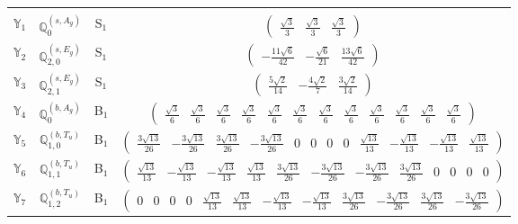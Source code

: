 \documentclass[fleqn,10pt,landscape]{article}
\begin{document}
\begin{itemize}
\begin{center}
\begin{longtable}{c|c|c|c}
 \hline \hline
\multicolumn{3}{r}{} \\ \endlastfoot

$ \mathbb{Y}_{1} $ & $\mathbb{Q}_{0}^{(s,A_{g})}$ & S$_{1}$ & $\begin{pmatrix} \frac{\sqrt{3}}{3} & \frac{\sqrt{3}}{3} & \frac{\sqrt{3}}{3} \end{pmatrix}$ \\
$ \mathbb{Y}_{2} $ & $\mathbb{Q}_{2,0}^{(s,E_{g})}$ & S$_{1}$ & $\begin{pmatrix} - \frac{11 \sqrt{6}}{42} & - \frac{\sqrt{6}}{21} & \frac{13 \sqrt{6}}{42} \end{pmatrix}$ \\
$ \mathbb{Y}_{3} $ & $\mathbb{Q}_{2,1}^{(s,E_{g})}$ & S$_{1}$ & $\begin{pmatrix} \frac{5 \sqrt{2}}{14} & - \frac{4 \sqrt{2}}{7} & \frac{3 \sqrt{2}}{14} \end{pmatrix}$ \\ \hline
$ \mathbb{Y}_{4} $ & $\mathbb{Q}_{0}^{(b,A_{g})}$ & B$_{1}$ & $\begin{pmatrix} \frac{\sqrt{3}}{6} & \frac{\sqrt{3}}{6} & \frac{\sqrt{3}}{6} & \frac{\sqrt{3}}{6} & \frac{\sqrt{3}}{6} & \frac{\sqrt{3}}{6} & \frac{\sqrt{3}}{6} & \frac{\sqrt{3}}{6} & \frac{\sqrt{3}}{6} & \frac{\sqrt{3}}{6} & \frac{\sqrt{3}}{6} & \frac{\sqrt{3}}{6} \end{pmatrix}$ \\
$ \mathbb{Y}_{5} $ & $\mathbb{Q}_{1,0}^{(b,T_{u})}$ & B$_{1}$ & $\begin{pmatrix} \frac{3 \sqrt{13}}{26} & - \frac{3 \sqrt{13}}{26} & \frac{3 \sqrt{13}}{26} & - \frac{3 \sqrt{13}}{26} & 0 & 0 & 0 & 0 & \frac{\sqrt{13}}{13} & - \frac{\sqrt{13}}{13} & - \frac{\sqrt{13}}{13} & \frac{\sqrt{13}}{13} \end{pmatrix}$ \\
$ \mathbb{Y}_{6} $ & $\mathbb{Q}_{1,1}^{(b,T_{u})}$ & B$_{1}$ & $\begin{pmatrix} \frac{\sqrt{13}}{13} & - \frac{\sqrt{13}}{13} & - \frac{\sqrt{13}}{13} & \frac{\sqrt{13}}{13} & \frac{3 \sqrt{13}}{26} & - \frac{3 \sqrt{13}}{26} & - \frac{3 \sqrt{13}}{26} & \frac{3 \sqrt{13}}{26} & 0 & 0 & 0 & 0 \end{pmatrix}$ \\
$ \mathbb{Y}_{7} $ & $\mathbb{Q}_{1,2}^{(b,T_{u})}$ & B$_{1}$ & $\begin{pmatrix} 0 & 0 & 0 & 0 & \frac{\sqrt{13}}{13} & \frac{\sqrt{13}}{13} & - \frac{\sqrt{13}}{13} & - \frac{\sqrt{13}}{13} & \frac{3 \sqrt{13}}{26} & - \frac{3 \sqrt{13}}{26} & \frac{3 \sqrt{13}}{26} & - \frac{3 \sqrt{13}}{26} \end{pmatrix}$ \\

\end{longtable}
\end{center}
\end{itemize}
\end{document}
